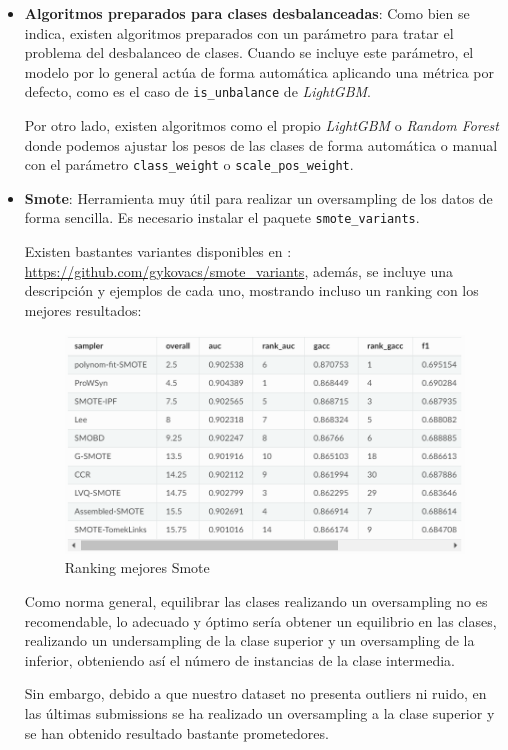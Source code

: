 \begin{itemize}
	\item \textbf{Algoritmos preparados para clases desbalanceadas}: Como bien se indica, existen algoritmos preparados con un parámetro para tratar el problema del desbalanceo de clases. 
	Cuando se incluye este parámetro, el modelo por lo general actúa de forma automática aplicando una métrica por defecto, como es el caso de \texttt{is\_unbalance} de \textit{LightGBM}.
	
	Por otro lado, existen algoritmos como el propio \textit{LightGBM} o \textit{Random Forest} donde podemos ajustar los pesos de las clases de forma automática o manual con el parámetro \texttt{class\_weight} o \texttt{scale\_pos\_weight}.
	
	\item \textbf{Smote}:  Herramienta muy útil para realizar un oversampling de los datos de forma sencilla. Es necesario instalar el paquete \texttt{smote\_variants}.
	
	Existen bastantes variantes disponibles en : \url{https://github.com/gykovacs/smote_variants}, además, se incluye una descripción y ejemplos de cada uno, mostrando incluso un ranking con los mejores resultados:
	
	\begin{figure}[H]
		\centering
		\includegraphics[width=1\textwidth]{img/smoter.png}
		\caption{Ranking mejores Smote}
	\end{figure}

	
	Como norma general, equilibrar las clases realizando un oversampling no es recomendable, lo adecuado y óptimo sería obtener un equilibrio en las clases, realizando un undersampling de la clase superior y un oversampling de la inferior, obteniendo así el número de instancias de la clase intermedia.
	
	Sin embargo, debido a que nuestro dataset no presenta outliers ni ruido, en las últimas submissions se ha realizado un oversampling a la clase superior y se han obtenido resultado bastante prometedores.
	

\end{itemize}
